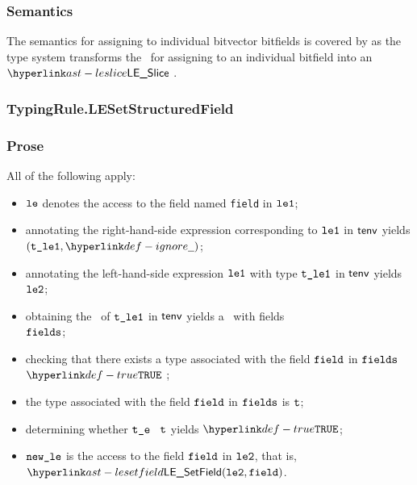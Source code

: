 \subsubsection{Semantics}
The semantics for assigning to individual bitvector bitfields is covered by 
as the type system transforms the \untypedast\ for assigning to an individual bitfield into an $\LESlice$ \typedast.

\subsubsection{TypingRule.LESetStructuredField\label{sec:TypingRule.LESetStructuredField}}
\subsubsection{Prose}
All of the following apply:
\begin{itemize}
  \item $\texttt{le}$ denotes the access to the field named \texttt{field} in $\texttt{le1}$;
  \item annotating the right-hand-side expression corresponding to $\texttt{le1}$ in $\textsf{tenv}$ yields \\ $(\vtleone, \Ignore)$\ProseOrTypeError;
  \item annotating the left-hand-side expression  $\texttt{le1}$ with type $\texttt{t\_le1}$ in $\textsf{tenv}$ yields $\texttt{le2}$\ProseOrTypeError;
  \item obtaining the \structure\ of $\texttt{t\_le1}$ in $\textsf{tenv}$ yields a \structuredtype\ with fields \\
        $\texttt{fields}$\ProseOrTypeError;
  \item checking that there exists a type associated with the field $\texttt{field}$ in $\texttt{fields}$ $\True$ \ProseTerminateAs{\MissingField};
  \item the type associated with the field $\texttt{field}$ in $\texttt{fields}$ is $\texttt{t}$;
  \item determining whether $\texttt{t\_e}$ \typesatisfies\ $\texttt{t}$ yields $\True$\ProseOrTypeError;
  \item $\texttt{new\_le}$ is the access to the field $\texttt{field}$ in $\texttt{le2}$, that is, $\LESetField(\vletwo, \field)$.
\end{itemize}

